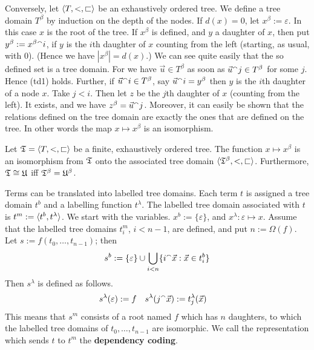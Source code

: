 Conversely, let $\langle T, <, \sqsubset\rangle$ be an exhaustively ordered
tree. We define a tree domain $T^{\beta}$ by induction on the depth
of the nodes.  If $d(x) = 0$, let $x^{\beta} := \varepsilon$. In this
case $x$ is the root of the tree. If $x^{\beta}$ is defined, and $y$ 
a daughter of $x$, then put $y^{\beta} := x^{\beta} {^{\smallfrown}} i$, if $y$ 
is the $i$th daughter of $x$ counting from the left (starting, as usual, 
with 0). (Hence we have $| x^{\beta} | = d(x)$.) We can see quite 
easily that the so defined set is a tree domain. For we have
$\vec{u} \in T^{\beta}$ as soon as $\vec{u} {^{\smallfrown}} j \in T^{\beta}$
for some $j$. Hence (td1) holds. Further, if $\vec{u} {^{\smallfrown}} i \in
T^{\beta}$, say $\vec{u} {^{\smallfrown}} i = y^{\beta}$ then $y$ is the $i$th
daughter of a node $x$. Take $j < i$. Then let $z$ be the $j$th
daughter of $x$ (counting from the left). It exists, and we have
$z^{\beta} = \vec{u} {^{\smallfrown}} j$. Moreover, it can easily be shown 
that the relations defined on the tree domain are exactly the ones 
that are defined on the tree. In other words the map $x \mapsto %
x^{\beta}$ is an isomorphism. 
\begin{thm}
Let $\mathfrak{T} = \langle T, <, \sqsubset\rangle$ be a finite, exhaustively
ordered tree. The function $x \mapsto x^{\beta}$ is an isomorphism
from $\mathfrak{T}$ onto the associated tree domain $\auf \GT^{\beta}, <, %
\sqsubset\zu$. Furthermore, $\mathfrak{T} \cong \mathfrak{U}$ iff
$\mathfrak{T}^{\beta} = \mathfrak{U}^{\beta}$.
\proofend
\end{thm}
Terms can be translated into labelled tree domains.
Each term $t$ is assigned a tree domain $t^b$ and a labelling function
$t^{\lambda}$. The labelled tree domain associated with $t$
is $t^m := \langle t^b, t^{\lambda}\rangle$. We start with the variables.
$x^b := \{\varepsilon\}$, and $x^{\lambda} \colon \varepsilon \mapsto x$.
Assume that the labelled tree domains $t_i^m$, $i < n-1$, are
defined, and put $n := \Omega(f)$. Let $s := f(t_0, \dotsc, t_{n-1})$;
then
\begin{equation}
s^b := \{\varepsilon\} \cup
    \bigcup_{i < n} \{i {^{\smallfrown}} \vec{x} : \vec{x} \in t_i^b\} 
\end{equation}
Then $s^{\lambda}$ is defined as follows.
\begin{align}
s^{\lambda}(\varepsilon) & := f &
s^{\lambda}(j {^{\smallfrown}} \vec{x}) & := t_j^{\lambda}(\vec{x})
\end{align}
This means that $s^m$ consists of a root named $f$ which has
$n$ daughters, to which the labelled tree domains of $t_0,
\dotsc, t_{n-1}$ are isomorphic. We call the representation 
which sends $t$ to $t^m$ the \textbf{dependency coding}.
